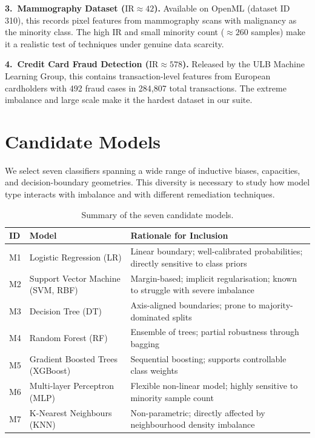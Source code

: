 \documentclass[11pt,a4paper]{article}
\newcommand{\IR}{\mathrm{IR}}
\begin{document}
\textbf{3.~Mammography Dataset ($\IR \approx 42$).} Available on OpenML (dataset ID 310),
this records pixel features from mammography scans with malignancy as the minority class.
The high IR and small minority count ($\approx 260$ samples) make it a realistic test of
techniques under genuine data scarcity.

\textbf{4.~Credit Card Fraud Detection ($\IR \approx 578$).} Released by the ULB Machine
Learning Group, this contains transaction-level features from European cardholders with 492
fraud cases in 284{,}807 total transactions. The extreme imbalance and large scale make it
the hardest dataset in our suite.

\section{Candidate Models}

We select seven classifiers spanning a wide range of inductive biases, capacities, and
decision-boundary geometries. This diversity is necessary to study how model type interacts
with imbalance and with different remediation techniques.

\begin{table}[ht]
\centering
\caption{Summary of the seven candidate models.}
\begin{tabularx}{\textwidth}{llX}
\toprule
\textbf{ID} & \textbf{Model} & \textbf{Rationale for Inclusion} \\
\midrule
M1 & Logistic Regression (LR)       & Linear boundary; well-calibrated probabilities; directly sensitive to class priors \\
M2 & Support Vector Machine (SVM, RBF) & Margin-based; implicit regularisation; known to struggle with severe imbalance \\
M3 & Decision Tree (DT)             & Axis-aligned boundaries; prone to majority-dominated splits \\
M4 & Random Forest (RF)             & Ensemble of trees; partial robustness through bagging \\
M5 & Gradient Boosted Trees (XGBoost) & Sequential boosting; supports controllable class weights \\
M6 & Multi-layer Perceptron (MLP)   & Flexible non-linear model; highly sensitive to minority sample count \\
M7 & K-Nearest Neighbours (KNN)     & Non-parametric; directly affected by neighbourhood density imbalance \\
\bottomrule
\end{tabularx}
\end{table}
\end{document}
